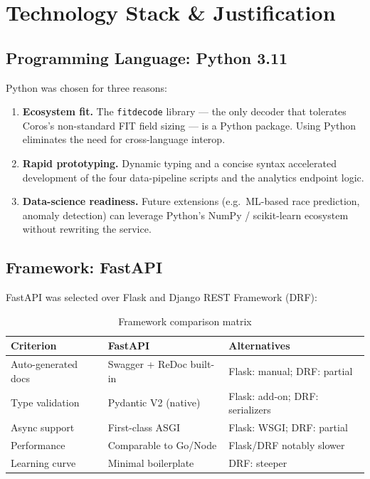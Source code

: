 \documentclass[10pt,a4paper]{article}
\begin{document}
\section{Technology Stack \& Justification}

\subsection{Programming Language: Python 3.11}

Python was chosen for three reasons:
\begin{enumerate}[leftmargin=1.5em]
  \item \textbf{Ecosystem fit.} The \texttt{fitdecode} library --- the only decoder that tolerates Coros's non-standard FIT field sizing --- is a Python package. Using Python eliminates the need for cross-language interop.
  \item \textbf{Rapid prototyping.} Dynamic typing and a concise syntax accelerated development of the four data-pipeline scripts and the analytics endpoint logic.
  \item \textbf{Data-science readiness.} Future extensions (e.g.\ ML-based race prediction, anomaly detection) can leverage Python's NumPy / scikit-learn ecosystem without rewriting the service.
\end{enumerate}

\subsection{Framework: FastAPI}

FastAPI was selected over Flask and Django REST Framework (DRF):

\begin{table}[h]
\centering
\begin{tabular}{@{}lll@{}}
\toprule
\textbf{Criterion} & \textbf{FastAPI} & \textbf{Alternatives} \\
\midrule
Auto-generated docs & Swagger + ReDoc built-in & Flask: manual; DRF: partial \\
Type validation      & Pydantic V2 (native)     & Flask: add-on; DRF: serializers \\
Async support        & First-class ASGI         & Flask: WSGI; DRF: partial \\
Performance          & Comparable to Go/Node    & Flask/DRF notably slower \\
Learning curve       & Minimal boilerplate      & DRF: steeper \\
\bottomrule
\end{tabular}
\caption{Framework comparison matrix}
\end{table}
\end{document}
